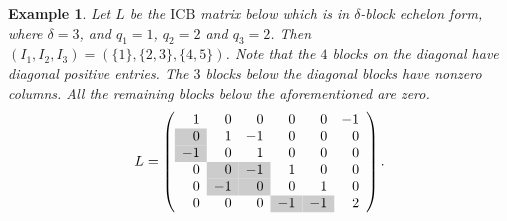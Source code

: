 \documentclass[10pt]{amsart}
\newcommand{\y}{\cellcolor{gray!40}}
\newcommand{\icb}{\mbox{$\mathrm{ICB}$}}
\newtheorem{example}[cdrthm]{Example}
\theoremstyle{definition}
\theoremstyle{remark}
\begin{document}
\begin{example}
Let $L$ be the $\icb$ matrix below which is in $\delta$-block echelon
form, where $\delta=3$, and $q_1=1$, $q_2=2$ and $q_3=2$. Then
$(I_1,I_2,I_3)=(\{1\},\{2,3\},\{4,5\})$. Note that the $4$ blocks on
the diagonal have diagonal positive entries. The $3$ blocks below the
diagonal blocks have nonzero columns. All the remaining blocks below
the aforementioned are zero.
\begin{eqnarray*}
L=\left(\begin{array}{rrrrrr}
1&0&0&0&0&-1\\
\y0&1&-1&0&0&0\\
\y-1&0&1&0&0&0\\
0&\y0&\y-1&1&0&0\\
0&\y-1&\y0&0&1&0\\
0&0&0&\y-1&\y-1&2\\
\end{array}\right).
\end{eqnarray*}
\end{example}
\end{document}
